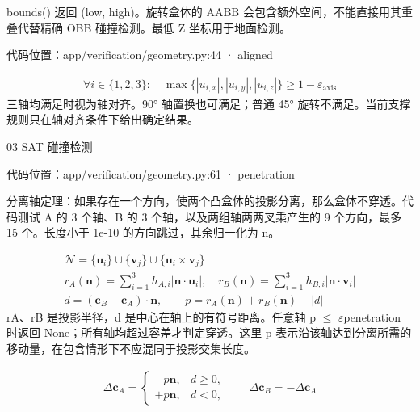 \documentclass[10pt,a4paper]{article}
\begin{document}
bounds() 返回 (low, high)。旋转盒体的 AABB 会包含额外空间，不能直接用其重叠代替精确 OBB 碰撞检测。最低 Z 坐标用于地面检测。\par
{\footnotesize\color{ink} 代码位置：app/verification/geometry.py:44 · aligned\par}
\[\begin{gathered}\forall i\in\{1,2,3\}:\quad\max\{|u_{i,x}|,|u_{i,y}|,|u_{i,z}|\}\ge1-\varepsilon_{\mathrm{axis}}\end{gathered}\]
三轴均满足时视为轴对齐。90° 轴置换也可满足；普通 45° 旋转不满足。当前支撑规则只在轴对齐条件下给出确定结果。\par
\clearpage
{\color{ink}\LARGE 03 SAT 碰撞检测\par}\vspace{5pt}
{\footnotesize\color{ink} 代码位置：app/verification/geometry.py:61 · penetration\par}
\par{}
分离轴定理：如果存在一个方向，使两个凸盒体的投影分离，那么盒体不穿透。代码测试 A 的 3 个轴、B 的 3 个轴，以及两组轴两两叉乘产生的 9 个方向，最多 15 个。长度小于 1e-10 的方向跳过，其余归一化为 n。\par
\[\begin{gathered}\mathcal N=\{\mathbf u_i\}\cup\{\mathbf v_j\}\cup\{\mathbf u_i\times\mathbf v_j\}\\ r_A(\mathbf n)=\sum_{i=1}^{3}h_{A,i}|\mathbf n\cdot\mathbf u_i|,\quad r_B(\mathbf n)=\sum_{i=1}^{3}h_{B,i}|\mathbf n\cdot\mathbf v_i|\\ d=(\mathbf c_B-\mathbf c_A)\cdot\mathbf n,\qquad p=r_A(\mathbf n)+r_B(\mathbf n)-|d|\end{gathered}\]
rA、rB 是投影半径，d 是中心在轴上的有符号距离。任意轴 p \(\le\) \(\varepsilon\)penetration 时返回 None；所有轴均超过容差才判定穿透。这里 p 表示沿该轴达到分离所需的移动量，在包含情形下不应混同于投影交集长度。\par
\par{}
\[\begin{gathered}\Delta\mathbf c_A=\begin{cases}-p\mathbf n,&d\ge0,\\+p\mathbf n,&d<0,\end{cases}\qquad \Delta\mathbf c_B=-\Delta\mathbf c_A\end{gathered}\]
\end{document}
